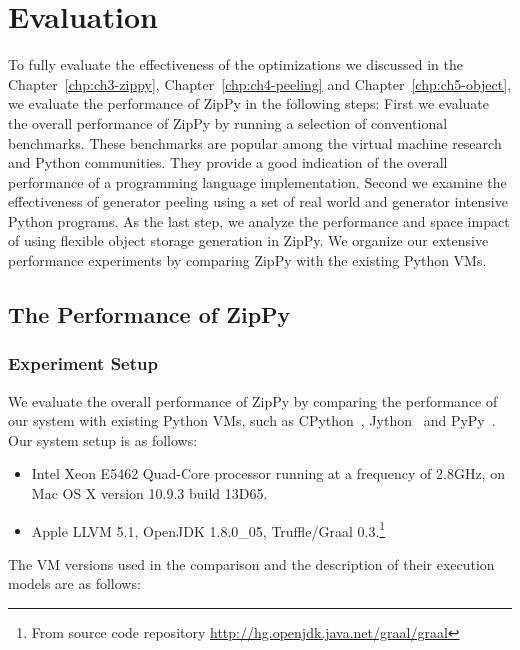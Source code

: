 \chapter{Evaluation}
\label{chp:ch5-evaluation}

To fully evaluate the effectiveness of the optimizations we discussed in the Chapter~\ref{chp:ch3-zippy}, Chapter~\ref{chp:ch4-peeling} and Chapter~\ref{chp:ch5-object}, we evaluate the performance of ZipPy in the following steps:
First we evaluate the overall performance of ZipPy by running a selection of conventional benchmarks.
These benchmarks are popular among the virtual machine research and Python communities.
They provide a good indication of the overall performance of a programming language implementation.
Second we examine the effectiveness of generator peeling using a set of real world and generator intensive Python programs.
As the last step, we analyze the performance and space impact of using flexible object storage generation in ZipPy.
We organize our extensive performance experiments by comparing ZipPy with the existing Python VMs.

\section{The Performance of ZipPy}

\subsection{Experiment Setup}

We evaluate the overall performance of ZipPy by comparing the performance of our system with existing Python VMs, such as CPython~\cite{python}, Jython~\cite{jython} and PyPy~\cite{pypy}.
Our system setup is as follows:

\begin{itemize}

\item Intel Xeon E5462 Quad-Core processor running at a frequency of 2.8GHz, on Mac OS X version 10.9.3 build 13D65.

\item Apple LLVM 5.1, OpenJDK 1.8.0\_05, Truffle/Graal 0.3.\footnote{From source code repository \url{http://hg.openjdk.java.net/graal/graal}}

\end{itemize}

The VM versions used in the comparison and the description of their execution models are as follows:

